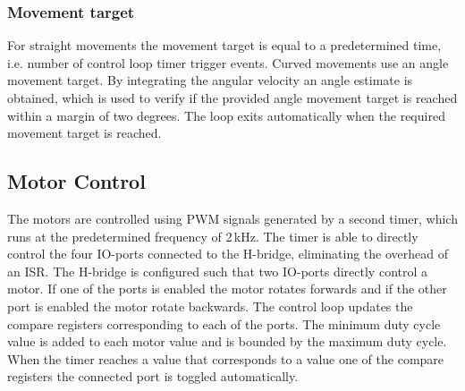 \subsubsection{Movement target}

For straight movements the movement target is equal to a predetermined time, i.e. number of control loop timer trigger events.
Curved movements use an angle movement target.
By integrating the angular velocity an angle estimate is obtained, which is used to verify if the provided angle movement target is reached within a margin of two degrees.
The loop exits automatically when the required movement target is reached.

\subsection{Motor Control}
The motors are controlled using PWM signals generated by a second timer, which runs at the predetermined frequency of 2\,kHz.
The timer is able to directly control the four IO-ports connected to the H-bridge, eliminating the overhead of an ISR.
The H-bridge is configured such that two IO-ports directly control a motor.
If one of the ports is enabled the motor rotates forwards and if the other port is enabled the motor rotate backwards.
The control loop updates the compare registers corresponding to each of the ports.
The minimum duty cycle value is added to each motor value and is bounded by the maximum duty cycle.
When the timer reaches a value that corresponds to a value one of the compare registers the connected port is toggled automatically.


